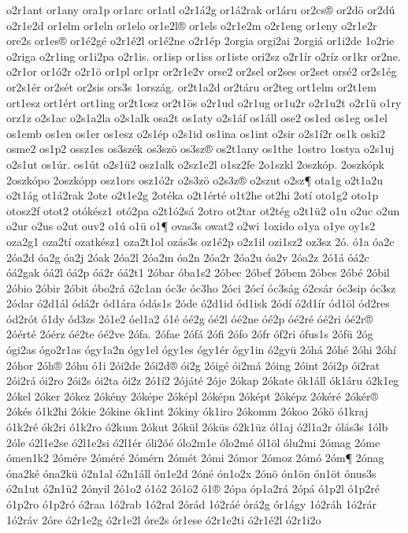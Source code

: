 {o2r1ant
or1any
ora1p
or1arc
or1atl
o2r1á2g
or1á2rak
or1áru
or2cs®
or2dö
or2dú
o2r1e2d
or1elm
or1eln
or1elo
or1e2l®
or1els
o2r1e2m
o2r1eng
or1eny
o2r1e2r
ore2s
or1es®
or1é2gé
o2r1é2l
or1é2ne
o2r1ép
2orgia
orgi2ai
2orgiá
or1i2de
1o2rie
o2riga
o2r1ing
or1i2pa
o2r1is.
or1isp
or1iss
or1iste
ori2sz
o2r1ír
o2ríz
or1kr
or2ne.
o2r1or
or1ó2r
o2r1ö
or1pl
or1pr
or2r1e2v
orse2
or2sel
or2ses
or2set
orsé2
or2s1ég
or2s1ér
or2sét
or2sis
ors3s
1ország.
or2t1a2d
or2táru
or2teg
ort1elm
or2t1em
ort1esz
ort1ért
ort1ing
or2t1osz
or2t1ös
o2r1ud
o2r1ug
or1u2r
o2r1u2t
o2r1ü
o1ry
orz1z
o2s1ac
o2s1a2la
o2s1alk
osa2t
os1aty
o2s1áf
os1áll
ose2
os1ed
os1eg
os1el
os1emb
os1en
os1er
os1esz
o2s1ép
o2s1id
os1ina
os1int
o2sir
o2s1í2r
os1k
oski2
osme2
os1p2
ossz1es
os3szék
os3szö
os3sz®
os2t1any
os1the
1ostro
1ostya
o2s1uj
o2s1ut
os1úr.
os1út
o2s1ü2
osz1alk
o2sz1e2l
o1sz2fe
2o1szkl
2oszkóp.
2oszkópk
2oszkópo
2oszkópp
osz1ors
osz1ó2r
o2s3zö
o2s3z®
o2szut
o2sz¶
ota1g
o2t1a2u
o2t1ág
ot1á2rak
2ote
o2t1e2g
2otéka
o2t1érté
o1t2he
ot2hi
2otí
oto1g2
oto1p
otosz2f
otot2
otókész1
otó2pa
o2t1ó2sá
2otro
ot2tar
ot2tég
o2t1ü2
o1u
o2uc
o2un
o2ur
o2us
o2ut
ouv2
o1ú
o1ü
o1¶
ovas3s
owat2
o2wi
1oxido
o1ya
o1ye
oy1s2
oza2g1
oza2tí
ozatkész1
oza2t1ol
ozás3s
oz1é2p
o2z1il
ozi1sz2
oz3sz
2ó.
ó1a
óa2c
2óa2d
óa2g
óa2j
2óak
2óa2l
2óa2m
óa2n
2óa2r
2óa2u
óa2v
2óa2z
2ó1á
óá2c
óá2gak
óá2l
óá2p
óá2r
óá2t1
2óbar
óba1s2
2óbec
2óbef
2óbem
2óbes
2óbé
2óbil
2óbio
2óbir
2óbit
óbo2rá
ó2c1an
óc3c
óc3ho
2óci
2ócí
óc3ság
ó2csár
óc3sip
óc3sz
2ódar
ó2d1ál
ódá2r
ód1ára
ódás1s
2óde
ó2d1id
ód1isk
2ódí
ó2d1ír
ód1öl
ód2res
ód2rót
ó1dy
ód3zs
2ó1e2
óel1a2
ó1é
óé2g
óé2l
óé2ne
óé2p
óé2ré
óé2ri
óé2r®
2óérté
2óérz
óé2te
óé2ve
2ófa.
2ófae
2ófá
2ófi
2ófo
2ófr
óf2ri
ófus1s
2ófü
2óg
ógi2as
ógo2r1as
ógy1a2n
ógy1el
ógy1es
ógy1ér
ógy1in
ó2gyü
2óhá
2óhé
2óhi
2óhí
2óhor
2óh®
2óhu
ó1i
2ói2de
2ói2d®
ói2g
2óigé
ói2má
2óing
2óint
2ói2p
ói2rat
2ói2rá
ói2ro
2ói2s
ói2ta
ói2z
2ó1í2
2ójáté
2óje
2ókap
2ókate
ók1áll
ók1áru
ó2k1eg
2ókel
2óker
2ókez
2ókény
2óképe
2óképl
2óképn
2óképt
2óképz
2ókéré
2ókér®
2ókés
ó1k2hi
2ókie
2ókine
ók1int
2ókiny
ók1iro
2ókomm
2ókoo
2ókö
ó1kraj
ó1k2ré
ók2ri
ó1k2ro
ó2kum
2ókut
2ókül
2óküs
ó2k1üz
ól1aj
ó2l1a2r
ólás3s
1ólb
2óle
ó2l1e2se
ó2l1e2si
ó2l1ér
óli2óé
ólo2m1e
ólo2mé
ól1öl
ólu2mi
2ómag
2óme
ómen1k2
2ómére
2óméré
2ómérn
2ómét
2ómi
2ómor
2ómoz
2ómó
2óm¶
2ónag
óna2ké
óna2kü
ó2n1al
ó2n1áll
ón1e2d
2óné
ón1o2x
2ónö
ón1ön
ón1öt
ónus3s
ó2n1ut
ó2n1ü2
2ónyil
2ó1o2
ó1ó2
2ó1ö2
ó1®
2ópa
óp1a2rá
2ópá
ó1p2l
ó1p2ré
ó1p2ro
ó1p2ró
ó2raa
1ó2rab
1ó2ral
2órád
1ó2ráé
órá2g
ór1ágy
1ó2ráh
1ó2rár
1ó2ráv
2óre
ó2r1e2g
ó2r1e2l
óre2s
ór1ese
ó2r1e2ti
ó2r1é2l
ó2r1i2o
}
